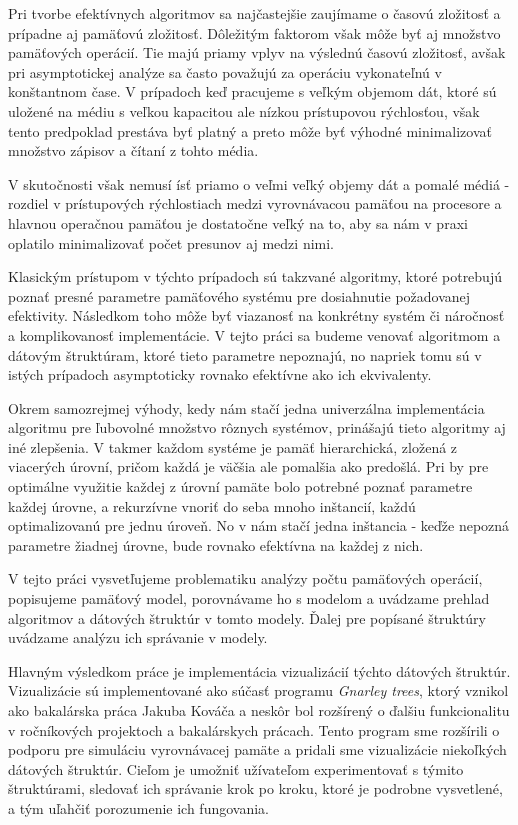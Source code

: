 
Pri tvorbe efektívnych algoritmov sa najčastejšie zaujímame o časovú zložitosť a prípadne aj pamäťovú zložitosť. Dôležitým faktorom však môže byť aj množstvo pamäťových operácií. Tie majú priamy vplyv na výslednú časovú zložitosť, avšak pri asymptotickej analýze sa často považujú za operáciu vykonateľnú v konštantnom čase. V prípadoch keď pracujeme s veľkým objemom dát, ktoré sú uložené na médiu s veľkou kapacitou ale nízkou prístupovou rýchlosťou, však tento predpoklad prestáva byť platný a preto môže byť výhodné minimalizovať množstvo zápisov a čítaní z tohto média. 

V skutočnosti však nemusí ísť priamo o veľmi veľký objemy dát a pomalé médiá - rozdiel v prístupových rýchlostiach medzi vyrovnávacou pamäťou na procesore a hlavnou operačnou pamäťou je dostatočne veľký na to, aby sa nám v praxi oplatilo minimalizovať počet presunov aj medzi nimi.

Klasickým prístupom v týchto prípadoch sú takzvané \aware algoritmy, ktoré potrebujú poznať presné parametre pamäťového systému pre dosiahnutie požadovanej efektivity. Následkom toho môže byť viazanosť na konkrétny systém či náročnosť a komplikovanosť implementácie. V tejto práci sa budeme venovať \obliv algoritmom a dátovým štruktúram, ktoré tieto parametre nepoznajú, no napriek tomu sú v istých prípadoch asymptoticky rovnako efektívne ako ich \aware ekvivalenty.

Okrem samozrejmej výhody, kedy nám stačí jedna univerzálna implementácia algoritmu pre ľubovolné množstvo rôznych systémov, prinášajú tieto algoritmy aj iné zlepšenia. V takmer každom systéme je pamäť hierarchická, zložená z viacerých úrovní, pričom každá je väčšia ale pomalšia ako predošlá. Pri \aware by pre optimálne využitie každej z úrovní pamäte bolo potrebné poznať parametre každej úrovne, a rekurzívne vnoriť do seba mnoho inštancií, každú optimalizovanú pre jednu úroveň. No v \obliv nám stačí jedna inštancia - keďže nepozná parametre žiadnej úrovne, bude rovnako efektívna na každej z nich.

V tejto práci vysvetľujeme problematiku analýzy počtu pamäťových operácií, popisujeme \obliv pamäťový model, porovnávame ho s \aware modelom a uvádzame prehlad algoritmov a dátových štruktúr v tomto modely. Ďalej pre popísané štruktúry uvádzame analýzu ich správanie v \obliv modely.

Hlavným výsledkom práce je implementácia vizualizácií týchto dátových štruktúr. Vizualizácie sú implementované ako súčasť programu {\em Gnarley trees}, ktorý vznikol ako bakalárska práca Jakuba Kováča a neskôr bol rozšírený o ďalšiu funkcionalitu v ročníkových projektoch a bakalárskych prácach. Tento program sme rozšírili o podporu pre simuláciu vyrovnávacej pamäte a pridali sme vizualizácie niekoľkých \obliv dátových štruktúr. Cieľom je umožniť užívateľom experimentovať s týmito štruktúrami, sledovať ich správanie krok po kroku, ktoré je podrobne vysvetlené, a tým uľahčiť porozumenie ich fungovania. 